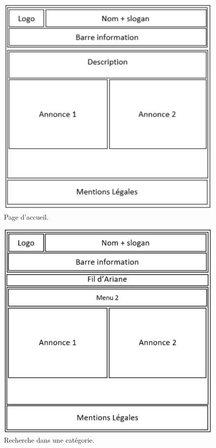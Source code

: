 \documentclass[a4paper,11pt]{article}
\begin{document}
\begin{figure}[H]
  \includegraphics[width=\linewidth]{images/maquette-accueil.png}
  \caption{Page d'accueil.}
  \label{fig:maquette-accueil}
\end{figure}

\begin{figure}[H]
  \includegraphics[width=\linewidth]{images/maquette-recherche.png}
  \caption{Recherche dans une catégorie.}
  \label{fig:maquette-recherche}
\end{figure}
\end{document}
